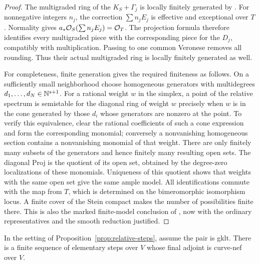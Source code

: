 \begin{proof}
The multigraded ring of the $K_S+\Gamma_j$ is locally finitely
generated by \cite[Theorem~3.1]{DHP2024}.  For nonnegative integers
$n_j$, the correction $\sum n_jE_j$ is effective and exceptional
over $T$.  Normality gives
$a_*\mathcal O_S(\sum n_jE_j)=\mathcal O_T$.  The projection formula therefore
identifies every multigraded piece with the corresponding piece for
the $D_j$, compatibly with multiplication.  Passing to one common
Veronese removes all rounding.  Thus their actual multigraded ring
is locally finitely generated as well.

For completeness, finite generation gives the required finiteness as
follows.  On a sufficiently small neighborhood choose homogeneous
generators with multidegrees $d_1,\ldots,d_N\in\mathbb N^{s+1}$.  For a
rational weight $w$ in the simplex, a point of the relative spectrum
is semistable for the diagonal ring of weight $w$ precisely when
$w$ is in the cone generated by those $d_i$ whose generators are
nonzero at the point.  To verify this equivalence, clear the rational
coefficients of such a cone expression and form the corresponding
monomial; conversely a nonvanishing homogeneous section contains a
nonvanishing monomial of that weight.  There are only finitely many
subsets of the generators and hence finitely many resulting open
sets.  The diagonal Proj is the quotient of its open set, obtained by
the degree-zero localizations of these monomials.  Uniqueness of this
quotient shows that weights with the same open set give the same
ample model.  All identifications commute with the map from $T$,
which is determined on the bimeromorphic isomorphism locus.  A finite
cover of the Stein compact makes the number of possibilities finite
there.  This is also the marked finite-model conclusion of
\cite[Theorem~E]{Fujino2022}, now with the ordinary representatives
and the smooth reduction justified.
\end{proof}

\begin{proposition}\label{prop:relative-finite}
In the setting of Proposition~\ref{prop:relative-steps}, assume the
pair is gklt.  There is a finite sequence of elementary steps over
$V$ whose final adjoint is curve-nef over $V$.
\end{proposition}

